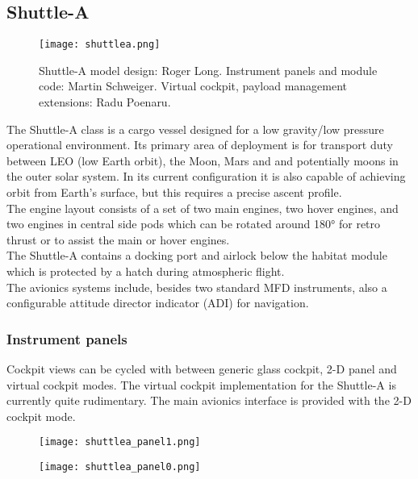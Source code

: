 \documentclass[Orbiter User Manual.tex]{subfiles}
\begin{document}
\subsection{Shuttle-A}

\begin{figure}[H]
  \centering
  \texttt{[image: shuttlea.png]}
  \caption{Shuttle-A model design: Roger Long. Instrument panels and module code: Martin Schweiger. Virtual cockpit, payload management extensions: Radu Poenaru.}
\end{figure}

\noindent
The Shuttle-A class is a cargo vessel designed for a low gravity/low pressure operational environment. Its primary area of deployment is for transport duty between LEO (low Earth orbit), the Moon, Mars and and potentially moons in the outer solar system. In its current configuration it is also capable of achieving orbit from Earth's surface, but this requires a precise ascent profile.\\
The engine layout consists of a set of two main engines, two hover engines, and two engines in central side pods which can be rotated around 180° for retro thrust or to assist the main or hover engines.\\
The Shuttle-A contains a docking port and airlock below the habitat module which is protected by a hatch during atmospheric flight.\\
The avionics systems include, besides two standard MFD instruments, also a configurable attitude director indicator (ADI) for navigation.

\subsubsection{Instrument panels}
Cockpit views can be cycled with  between generic glass cockpit, 2-D panel and virtual cockpit modes. The virtual cockpit implementation for the Shuttle-A is currently quite rudimentary. The main avionics interface is provided with the 2-D cockpit mode.

\begin{figure}[H]
  \centering
  \texttt{[image: shuttlea\_panel1.png]}
\end{figure}

\begin{figure}[H]
  \centering
  \texttt{[image: shuttlea\_panel0.png]}
\end{figure}
\end{document}
